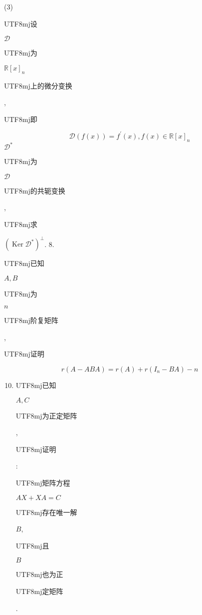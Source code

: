 \documentclass[10pt]{article}
\begin{document}
(3) \begin{CJK}{UTF8}{mj}设\end{CJK} $\mathscr{D}$ \begin{CJK}{UTF8}{mj}为\end{CJK} $\mathbb{R}[x]_{n}$ \begin{CJK}{UTF8}{mj}上的微分变换\end{CJK}, \begin{CJK}{UTF8}{mj}即\end{CJK}
$$
\mathscr{D}(f(x))=f^{\prime}(x), f(x) \in \mathbb{R}[x]_{n}
$$
$\mathscr{D}^{*}$ \begin{CJK}{UTF8}{mj}为\end{CJK} $\mathscr{D}$ \begin{CJK}{UTF8}{mj}的共轭变换\end{CJK}, \begin{CJK}{UTF8}{mj}求\end{CJK} $\left(\operatorname{Ker} \mathscr{D}^{*}\right)^{\perp}$. 8. \begin{CJK}{UTF8}{mj}已知\end{CJK} $A, B$ \begin{CJK}{UTF8}{mj}为\end{CJK} $n$ \begin{CJK}{UTF8}{mj}阶复矩阵\end{CJK}, \begin{CJK}{UTF8}{mj}证明\end{CJK}
$$
r(A-A B A)=r(A)+r\left(I_{n}-B A\right)-n
$$

\begin{enumerate}
  \setcounter{enumi}{9}
  \item \begin{CJK}{UTF8}{mj}已知\end{CJK} $A, C$ \begin{CJK}{UTF8}{mj}为正定矩阵\end{CJK}, \begin{CJK}{UTF8}{mj}证明\end{CJK}: \begin{CJK}{UTF8}{mj}矩阵方程\end{CJK} $A X+X A=C$ \begin{CJK}{UTF8}{mj}存在唯一解\end{CJK} $B$, \begin{CJK}{UTF8}{mj}且\end{CJK} $B$ \begin{CJK}{UTF8}{mj}也为正\end{CJK} \begin{CJK}{UTF8}{mj}定矩阵\end{CJK}.
\end{enumerate}
\end{document}
